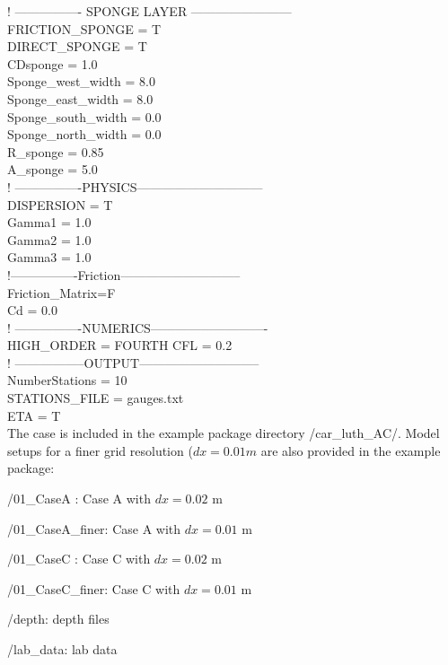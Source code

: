 \documentclass[11pt]{article}
\begin{document}
  ! ---------------- SPONGE LAYER ------------------------ \\
 FRICTION\_SPONGE = T \\
DIRECT\_SPONGE = T     \\
CDsponge = 1.0 \\
Sponge\_west\_width =  8.0 \\
Sponge\_east\_width =  8.0  \\
Sponge\_south\_width = 0.0  \\
Sponge\_north\_width = 0.0  \\
R\_sponge = 0.85  \\
A\_sponge = 5.0  \\

  ! ----------------PHYSICS------------------------------ \\
  DISPERSION = T \\
Gamma1 = 1.0 \\
Gamma2 = 1.0 \\
Gamma3 = 1.0 \\


 !----------------Friction----------------------------- \\
 Friction\_Matrix=F \\
Cd = 0.0  \\

 ! ----------------NUMERICS---------------------------- \\
HIGH\_ORDER = FOURTH
CFL = 0.2 \\

! -----------------OUTPUT----------------------------- \\
NumberStations = 10 \\
STATIONS\_FILE = gauges.txt \\
ETA = T \\



The case is included in the example package directory /car\_luth\_AC/.  Model setups for a finer grid resolution ($dx = 0.01m$ are also provided in the example package:

/01\_CaseA : Case A with $dx = 0.02$ m

/01\_CaseA\_finer: Case A with $dx = 0.01$ m

/01\_CaseC : Case C with $dx = 0.02$ m

/01\_CaseC\_finer: Case C with $dx = 0.01$ m

/depth:  depth files

/lab\_data: lab data
\end{document}
